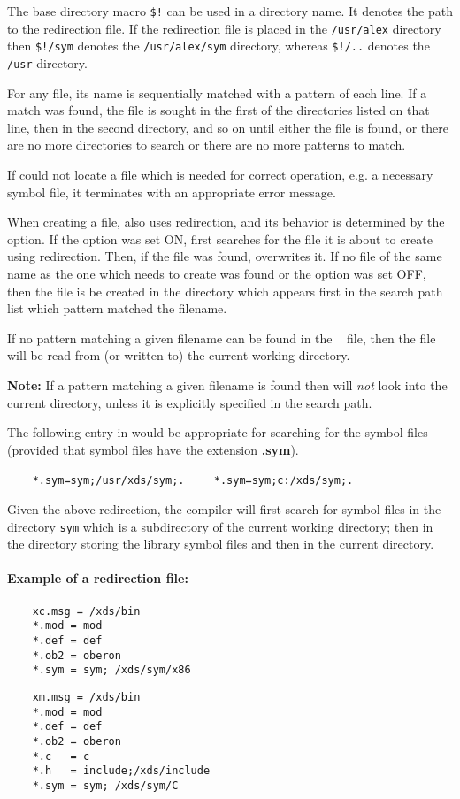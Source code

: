 The base directory macro \verb|$!|  %
can be used in a directory name.
It denotes the path to the redirection file.
If the redirection file is placed in the \verb|/usr/alex| directory
then \verb|$!/sym| denotes the \verb|/usr/alex/sym| directory,
whereas \verb|$!/..| denotes the \verb|/usr| directory.

For any file, its name is sequentially matched with a pattern
of each line. If a match was found, the file is sought in the
first of the directories listed on that line, then in the second
directory, and so on until either the file is found, or there are
no more directories to search or there are no more patterns to match.

If \xc{} could not locate a file which is needed for correct
operation, e.g. a necessary symbol file, it terminates
with an appropriate error message.

When creating a file, \xc{} also uses redirection, and its
behavior is determined by the  option. If the
option was set ON, \xc{} first searches for the file it is
about to create using redirection. Then, if the file was found,
\xc{} overwrites it. If no file of the same name as the one which \xc{} needs
to create was found or the  option was set OFF, then the
file is be created in the directory which appears first in the
search path list which pattern matched the filename.

If no pattern matching a given filename can be found in the {\tt
\red} file, then the file will be read from (or written to) the
current working directory.

{\bf Note:}
If a pattern matching a given filename is found then \xc{}
will {\em not} look into the current directory, unless it is
explicitly specified in the search path.

The following entry in {\tt \red} would be appropriate for
searching for the symbol files (provided that symbol files have the
extension {\bf.sym}).

\ifunix
\verb'    *.sym=sym;/usr/xds/sym;.'
\else
\verb'    *.sym=sym;c:/xds/sym;.'
\fi

Given the above redirection, the compiler will first search for
symbol files in the directory \verb'sym'
which is a subdirectory of the current working directory; then in the
directory storing the \xds{} library symbol files and then in
the current directory.

\paragraph{Example of a redirection file:}
\ifgencode
\begin{verbatim}
    xc.msg = /xds/bin
    *.mod = mod
    *.def = def
    *.ob2 = oberon
    *.sym = sym; /xds/sym/x86
\end{verbatim}
\else %
\begin{verbatim}
    xm.msg = /xds/bin
    *.mod = mod
    *.def = def
    *.ob2 = oberon
    *.c   = c
    *.h   = include;/xds/include
    *.sym = sym; /xds/sym/C
\end{verbatim}
\fi %

